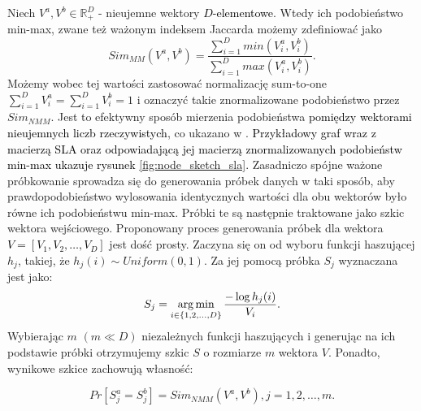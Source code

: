             Niech $V^a, V^b \in \mathbb{R}_{+}^{D}$ - nieujemne wektory \textcolor{black}{$D$-elementowe}. Wtedy ich podobieństwo min-max, zwane też ważonym indeksem Jaccarda możemy zdefiniować jako 
            \begin{equation} \label{eq:sim_mm}  
                Sim_{MM}(V^a, V^b) = \frac{\sum \limits_{i = 1}^D min(V_i^{a}, V_i^{b})}{\sum \limits_{i = 1}^D max(V_i^{a}, V_i^{b})}.
            \end{equation}
            Możemy wobec tej wartości zastosować normalizację sum-to-one $\sum \limits_{i = 1}^D V_{i}^{a} = \sum \limits_{i = 1}^D V_{i}^{b} = 1$ i oznaczyć takie znormalizowane podobieństwo przez $Sim_{NMM}$. Jest to efektywny sposób mierzenia podobieństwa \textcolor{black}{pomiędzy wektorami nieujemnych liczb rzeczywistych}, co ukazano w \cite{10.1145/2783258.2783406}. \textcolor{black}{Przykładowy graf wraz z macierzą SLA oraz odpowiadającą jej macierzą znormalizowanych podobieństw min-max ukazuje rysunek \ref{fig:node_sketch_sla}.} Zasadniczo spójne ważone próbkowanie sprowadza się do generowania próbek danych w taki sposób, aby prawdopodobieństwo wylosowania identycznych wartości dla obu wektorów było równe ich podobieństwu min-max. Próbki te są następnie traktowane jako szkic wektora wejściowego. Proponowany proces generowania próbek dla wektora \textcolor{black}{$V = [V_1, V_2, \dots, V_D]$} jest dość prosty. Zaczyna się on od wyboru funkcji haszującej $h_j$, takiej, że $h_j(i) \sim Uniform(0,1)$. Za jej pomocą próbka $S_j$ wyznaczana jest jako:
            \begin{equation} \label{eq:node_sketch_1}  
                S_j = \operatorname*{arg\,min}_{i \in \{1,2,\dots, D\}} \frac{-\log h_{j}(i)}{V_i}.
            \end{equation}
            Wybierając $m$ $(m \ll D)$ niezależnych funkcji haszujących i generując na ich podstawie próbki otrzymujemy szkic $S$ o rozmiarze $m$ wektora $V$. Ponadto, wynikowe szkice zachowują własność:

            \begin{equation} \label{eq:node_sketch_2}  
                Pr[S_{j}^{a} = S_{j}^{b}] = Sim_{NMM}(V^a, V^b), j = 1,2,\dots,m.
            \end{equation}

